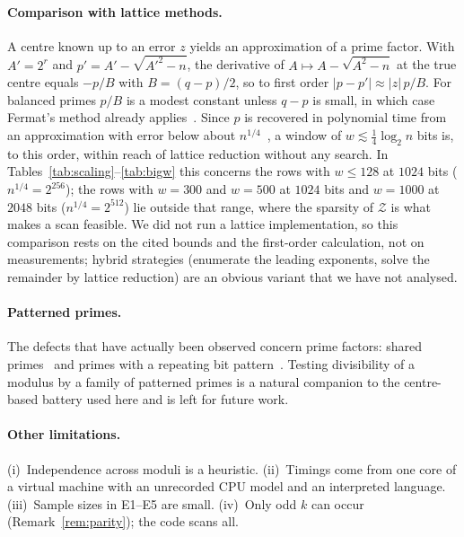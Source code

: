 \documentclass[11pt,a4paper]{article}
\begin{document}
\paragraph{Comparison with lattice methods.} A centre known up to an error $z$ yields an approximation of a prime factor. With $A'=2^r$ and $p'=A'-\sqrt{A'^2-n}$, the derivative of $A\mapsto A-\sqrt{A^2-n}$ at the true centre equals $-p/B$ with $B=(q-p)/2$, so to first order $|p-p'|\approx|z|\,p/B$. For balanced primes $p/B$ is a modest constant unless $q-p$ is small, in which case Fermat's method already applies~\cite{deweger}. Since $p$ is recovered in polynomial time from an approximation with error below about $n^{1/4}$~\cite{copp96b,hg01}, a window of $w\lesssim\tfrac14\log_2 n$ bits is, to this order, within reach of lattice reduction without any search. In Tables~\ref{tab:scaling}--\ref{tab:bigw} this concerns the rows with $w\le128$ at $1024$ bits ($n^{1/4}=2^{256}$); the rows with $w=300$ and $w=500$ at $1024$ bits and $w=1000$ at $2048$ bits ($n^{1/4}=2^{512}$) lie outside that range, where the sparsity of $\mathcal Z$ is what makes a scan feasible. We did not run a lattice implementation, so this comparison rests on the cited bounds and the first-order calculation, not on measurements; hybrid strategies (enumerate the leading exponents, solve the remainder by lattice reduction) are an obvious variant that we have not analysed.

\paragraph{Patterned primes.} The defects that have actually been observed concern prime factors: shared primes~\cite{heninger,lenstra} and primes with a repeating bit pattern~\cite{bernstein}. Testing divisibility of a modulus by a family of patterned primes is a natural companion to the centre-based battery used here and is left for future work.

\paragraph{Other limitations.} (i)~Independence across moduli is a heuristic. (ii)~Timings come from one core of a virtual machine with an unrecorded CPU model and an interpreted language. (iii)~Sample sizes in E1--E5 are small. (iv)~Only odd $k$ can occur (Remark~\ref{rem:parity}); the code scans all.
\end{document}
